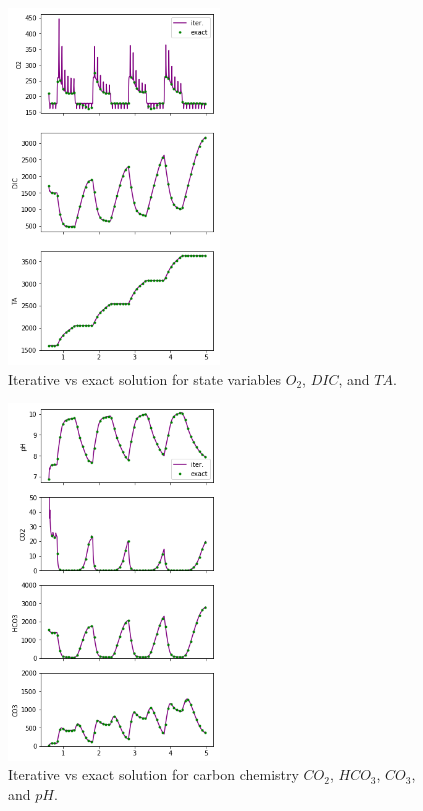 \documentclass{ruthesis}
\begin{document}
\begin{figure}
	\centerline{\includegraphics[width=0.5\textwidth]{images_microalgae/plots/iterative_states}}
	\caption[.]{Iterative vs exact solution for state variables $O_2$, $DIC$, and $TA$.}
	\label{fig:iterative_states}
\end{figure}


\begin{figure}
	\centerline{\includegraphics[width=0.5\textwidth]{images_microalgae/plots/iterative_carbon}}
	\caption[.]{Iterative vs exact solution for carbon chemistry $CO_2$, $HCO_3$, $CO_3$, and $pH$.}
	\label{fig:iterative_carbon}
\end{figure}
\end{document}
